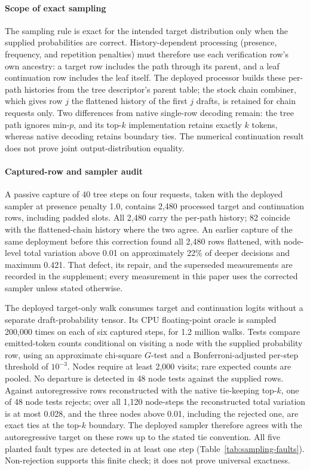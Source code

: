 \paragraph{Scope of exact sampling}
The sampling rule is exact for the intended target distribution only when the supplied probabilities are correct. History-dependent processing (presence, frequency, and repetition penalties) must therefore use each verification row's own ancestry: a target row includes the path through its parent, and a leaf continuation row includes the leaf itself. The deployed processor builds these per-path histories from the tree descriptor's parent table; the stock chain combiner, which gives row $j$ the flattened history of the first $j$ drafts, is retained for chain requests only. Two differences from native single-row decoding remain: the tree path ignores min-$p$, and its top-$k$ implementation retains exactly $k$ tokens, whereas native decoding retains boundary ties. The numerical continuation result does not prove joint output-distribution equality.

\paragraph{Captured-row and sampler audit}
A passive capture of 40 tree steps on four requests, taken with the deployed sampler at presence penalty 1.0, contains 2,480 processed target and continuation rows, including padded slots. All 2,480 carry the per-path history; 82 coincide with the flattened-chain history where the two agree. An earlier capture of the same deployment before this correction found all 2,480 rows flattened, with node-level total variation above 0.01 on approximately 22\% of deeper decisions and maximum 0.421. That defect, its repair, and the superseded measurements are recorded in the supplement; every measurement in this paper uses the corrected sampler unless stated otherwise.

The deployed target-only walk consumes target and continuation logits without a separate draft-probability tensor. Its CPU floating-point oracle is sampled 200,000 times on each of six captured steps, for 1.2 million walks. Tests compare emitted-token counts conditional on visiting a node with the supplied probability row, using an approximate chi-square $G$-test and a Bonferroni-adjusted per-step threshold of $10^{-3}$. Nodes require at least 2,000 visits; rare expected counts are pooled. No departure is detected in 48 node tests against the supplied rows. Against autoregressive rows reconstructed with the native tie-keeping top-$k$, one of 48 node tests rejects; over all 1,120 node-steps the reconstructed total variation is at most 0.028, and the three nodes above 0.01, including the rejected one, are exact ties at the top-$k$ boundary. The deployed sampler therefore agrees with the autoregressive target on these rows up to the stated tie convention. All five planted fault types are detected in at least one step (Table~\ref{tab:sampling-faults}). Non-rejection supports this finite check; it does not prove universal exactness.


